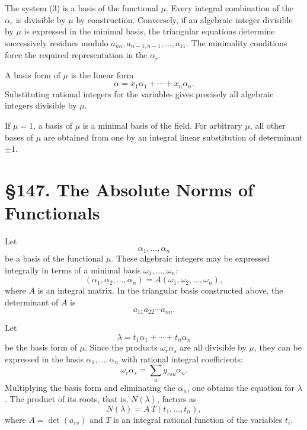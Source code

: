 \documentclass[12pt,a4paper]{article}
\newcommand{\webersection}[2]{\clearpage\section*{\S #1. #2}}
\begin{document}
The system (3) is a basis of the functional \(\mu\).  Every integral combination of the \(\alpha_r\) is divisible by \(\mu\) by construction.  Conversely, if an algebraic integer divisible by \(\mu\) is expressed in the minimal basis, the triangular equations determine successively residues modulo \(a_{nn},a_{n-1,n-1},
\ldots,a_{11}\).  The minimality conditions force the required representation in the \(\alpha_r\).

A basis form of \(\mu\) is the linear form
\begin{equation}
 \alpha=x_1\alpha_1+
\cdots+x_n\alpha_n. \tag{4}
\end{equation}
Substituting rational integers for the variables gives precisely all algebraic integers divisible by \(\mu\).

If \(\mu=1\), a basis of \(\mu\) is a minimal basis of the field.  For arbitrary \(\mu\), all other bases of \(\mu\) are obtained from one by an integral linear substitution of determinant \(\pm1\).

\webersection{147}{The Absolute Norms of Functionals}

Let
\[
 \alpha_1,
\ldots,
\alpha_n
\]
be a basis of the functional \(\mu\).  These algebraic integers may be expressed integrally in terms of a minimal basis \(\omega_1,
\ldots,
\omega_n\):
\begin{equation}
 (\alpha_1,
\alpha_2,
\ldots,
\alpha_n)=A(\omega_1,
\omega_2,
\ldots,
\omega_n), \tag{1}
\end{equation}
where \(A\) is an integral matrix.  In the triangular basis constructed above, the determinant of \(A\) is
\[
 a_{11}a_{22}\cdots a_{nn}.
\]

Let
\begin{equation}
 \lambda=t_1\alpha_1+
\cdots+t_n\alpha_n \tag{2}
\end{equation}
be the basis form of \(\mu\).  Since the products \(\omega_r\alpha_s\) are all divisible by \(\mu\), they can be expressed in the basis \(\alpha_1,
\ldots,
\alpha_n\) with rational integral coefficients:
\begin{equation}
 \omega_r\alpha_s=\sum_u g_{rsu}\alpha_u. \tag{3}
\end{equation}
Multiplying the basis form and eliminating the \(\alpha_u\), one obtains the equation for \(\lambda\).  The product of its roots, that is, \(N(\lambda)\), factors as
\begin{equation}
 N(\lambda)=A\,T(t_1,
\ldots,t_n), \tag{4}
\end{equation}
where \(A=\det(a_{rs})\) and \(T\) is an integral rational function of the variables \(t_i\).
\end{document}
